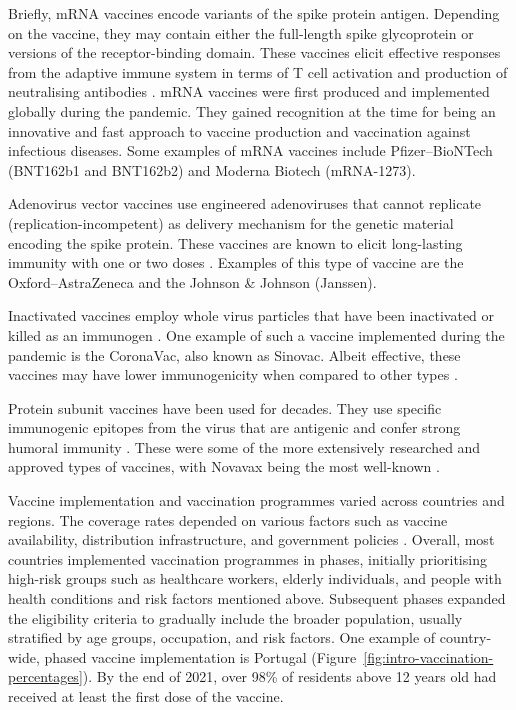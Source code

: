 Briefly, mRNA vaccines encode variants of the spike protein antigen.
Depending on the vaccine, they may contain either the full-length spike glycoprotein or versions of the receptor-binding domain.
These vaccines elicit effective responses from the adaptive immune system in terms of T cell activation and production of neutralising antibodies \citep{chaudhary2021MRNAVaccines}.
mRNA vaccines were first produced and implemented globally during the \covid pandemic.
They gained recognition at the time for being an innovative and fast approach to vaccine production and vaccination against infectious diseases.
Some examples of mRNA vaccines include Pfizer--BioNTech (BNT162b1 and BNT162b2) and Moderna Biotech (mRNA-1273).

Adenovirus vector vaccines use engineered adenoviruses that cannot replicate (replication-incompetent) as delivery mechanism for the genetic material encoding the \sars spike protein.
These vaccines are known to elicit long-lasting immunity with one or two doses \citep{mendonca2021AdenoviralVector}.
Examples of this type of vaccine are the Oxford--AstraZeneca and the Johnson \& Johnson (Janssen).

Inactivated vaccines employ whole virus particles that have been inactivated or killed as an immunogen \citep{jin2022CoronaVacReview}.
One example of such a vaccine implemented during the \covid pandemic is the CoronaVac, also known as Sinovac.
Albeit effective, these vaccines may have lower immunogenicity when compared to other types \citep{lim2021ComparativeImmunogenicity}.

Protein subunit vaccines have been used for decades.
They use specific immunogenic epitopes from the virus that are antigenic and confer strong humoral immunity \citep{rezaei2022NewGeneration}.%
These were some of the more extensively researched and approved types of \sars vaccines, with Novavax being the most well-known \citep{ao2023StrategiesDevelopment}.

Vaccine implementation and vaccination programmes varied across countries and regions.
The coverage rates depended on various factors such as vaccine availability, distribution infrastructure, and government policies \citep{irwin2021WhatIt, blasioli2023VaccineAllocation}.
Overall, most countries implemented vaccination programmes in phases, initially prioritising high-risk groups such as healthcare workers, elderly individuals, and people with health conditions and risk factors mentioned above.
Subsequent phases expanded the eligibility criteria to gradually include the broader population, usually stratified by age groups, occupation, and risk factors.
One example of country-wide, phased vaccine implementation is Portugal (Figure~\ref{fig:intro-vaccination-percentages}).
By the end of 2021, over 98\% of residents above 12 years old had received at least the first dose of the vaccine.

